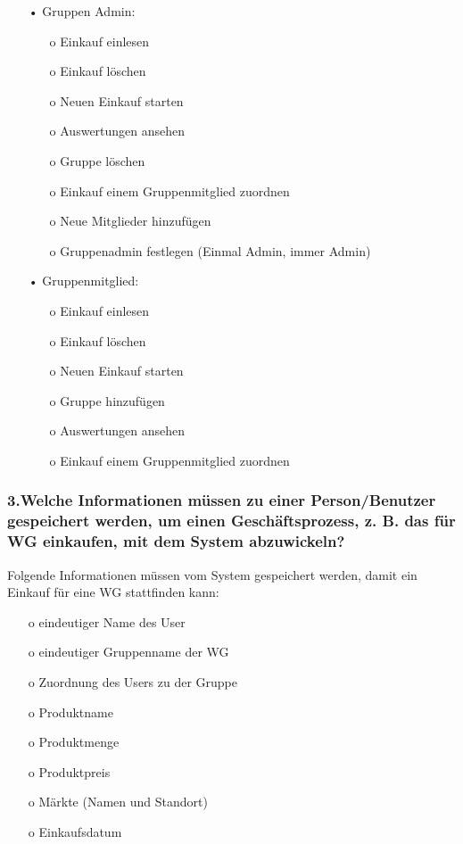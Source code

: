 \documentclass[12pt,a4paper]{article}
\begin{document}
\begin{itemize}
\item[•]Gruppen Admin:
\begin{itemize}
\item[o] Einkauf einlesen
\item[o] Einkauf löschen
\item[o] Neuen Einkauf starten
\item[o] Auswertungen ansehen
\item[o] Gruppe löschen
\item[o] Einkauf einem Gruppenmitglied zuordnen
\item[o] Neue Mitglieder hinzufügen
\item[o] Gruppenadmin festlegen (Einmal Admin, immer Admin)
\end{itemize}
\end{itemize}

\begin{itemize}
\item[•] Gruppenmitglied:
\begin{itemize}
\item[o] Einkauf einlesen
\item[o] Einkauf löschen
\item[o] Neuen Einkauf starten
\item[o] Gruppe hinzufügen
\item[o] Auswertungen ansehen
\item[o] Einkauf einem Gruppenmitglied zuordnen
\end{itemize}
\end{itemize}

\subsubsection*{3.Welche Informationen müssen zu einer Person/Benutzer gespeichert werden, um einen Geschäftsprozess, z. B. das für WG einkaufen, mit dem System abzuwickeln?}

Folgende Informationen müssen vom System gespeichert werden, damit ein Einkauf für eine WG stattfinden kann:
\begin{itemize} 
\item[o] eindeutiger Name des User
\item[o] eindeutiger Gruppenname der WG
\item[o] Zuordnung des Users zu der Gruppe
\item[o] Produktname
\item[o] Produktmenge
\item[o] Produktpreis
\item[o] Märkte (Namen und Standort)
\item[o] Einkaufsdatum
\end{itemize}
 
\end{document}
